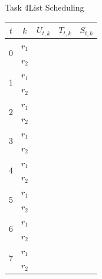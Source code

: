 \begin{frame}[allowframebreaks]{Task 4}{List Scheduling}
\begin{solutionnoinc}
\begin{tabular}{c|c|l|l|l|}
    \hline$t$ & $k$ & $U_{t, k}$ & $T_{t, k}$ & $S_{t, k}$ \\
    \hline \multirow{2}{*}{0} & $r_1$ & & & \\
    \cline { 2 - 5 } & $r_2$ & & & \\
    \hline \multirow{2}{*}{1} & $r_1$ & & & \\
    \cline { 2 - 5 } & $r_2$ & & & \\
    \hline \multirow{2}{*}{2} & $r_1$ & & & \\
    \cline { 2 - 5 } & $r_2$ & & & \\
    \hline \multirow{2}{*}{3} & $r_1$ & & & \\
    \cline { 2 - 5 } & $r_2$ & & & \\
    \hline \multirow{2}{*}{4} & $r_1$ & & & \\
    \cline { 2 - 5 } & $r_2$ & & & \\
    \hline \multirow{2}{*}{5} & $r_1$ & & & \\
    \cline { 2 - 5 } & $r_2$ & & & \\
    \hline \multirow{2}{*}{6} & $r_1$ & & & \\
    \cline { 2 - 5 } & $r_2$ & & & \\
    \hline \multirow{2}{*}{7} & $r_1$ & & & \\
    \cline { 2 - 5 } & $r_2$ & & & \\
    \hline
    \end{tabular}
  \end{solutionnoinc}
\end{frame}

